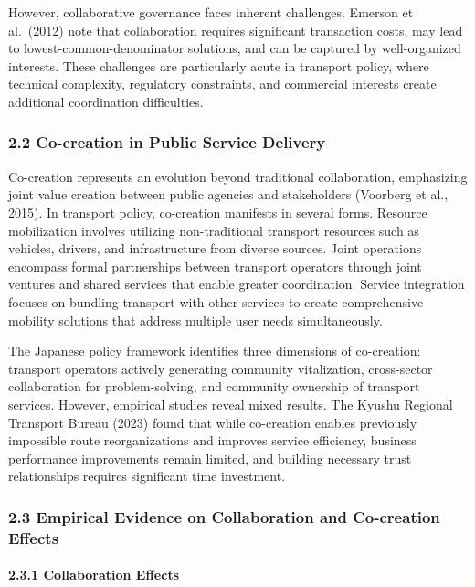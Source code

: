 However, collaborative governance faces inherent challenges. Emerson et al.~(2012) note that collaboration requires significant transaction costs, may lead to lowest-common-denominator solutions, and can be captured by well-organized interests. These challenges are particularly acute in transport policy, where technical complexity, regulatory constraints, and commercial interests create additional coordination difficulties.

\subsubsection{2.2 Co-creation in Public Service Delivery}\label{co-creation-in-public-service-delivery}

Co-creation represents an evolution beyond traditional collaboration, emphasizing joint value creation between public agencies and stakeholders (Voorberg et al., 2015). In transport policy, co-creation manifests in several forms. Resource mobilization involves utilizing non-traditional transport resources such as vehicles, drivers, and infrastructure from diverse sources. Joint operations encompass formal partnerships between transport operators through joint ventures and shared services that enable greater coordination. Service integration focuses on bundling transport with other services to create comprehensive mobility solutions that address multiple user needs simultaneously.

The Japanese policy framework identifies three dimensions of co-creation: transport operators actively generating community vitalization, cross-sector collaboration for problem-solving, and community ownership of transport services. However, empirical studies reveal mixed results. The Kyushu Regional Transport Bureau (2023) found that while co-creation enables previously impossible route reorganizations and improves service efficiency, business performance improvements remain limited, and building necessary trust relationships requires significant time investment.

\subsubsection{2.3 Empirical Evidence on Collaboration and Co-creation Effects}\label{empirical-evidence-on-collaboration-and-co-creation-effects}

\paragraph{2.3.1 Collaboration Effects}\label{collaboration-effects}


